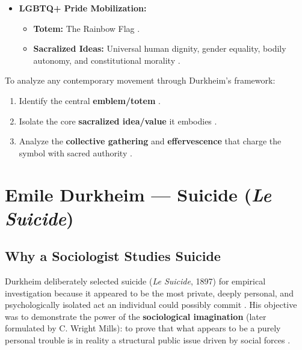 \begin{itemize}
    \item \textbf{LGBTQ+ Pride Mobilization:}
    \begin{itemize}
        \item \textbf{Totem:} The Rainbow Flag .
        \item \textbf{Sacralized Ideas:} Universal human dignity, gender equality, bodily autonomy, and constitutional morality .
    \end{itemize}
\end{itemize}

\begin{QuickRevision}
To analyze any contemporary movement through Durkheim's framework:
\begin{enumerate}
    \item Identify the central \textbf{emblem/totem} .
    \item Isolate the core \textbf{sacralized idea/value} it embodies .
    \item Analyze the \textbf{collective gathering} and \textbf{effervescence} that charge the symbol with sacred authority .
\end{enumerate}
\end{QuickRevision}

\sectiondivider

\section{Emile Durkheim --- Suicide (\textit{Le Suicide})}

\subsection{Why a Sociologist Studies Suicide}

\begin{KeyConcept}
Durkheim deliberately selected suicide (\textit{Le Suicide}, 1897) for empirical investigation because it appeared to be the most private, deeply personal, and psychologically isolated act an individual could possibly commit . His objective was to demonstrate the power of the \textbf{sociological imagination} (later formulated by C. Wright Mills): to prove that what appears to be a purely personal trouble is in reality a structural public issue driven by social forces .
\end{KeyConcept}

